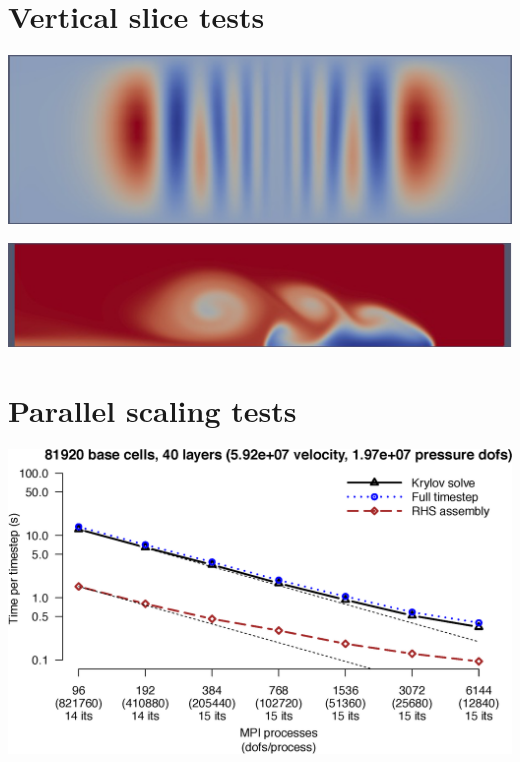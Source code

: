 \documentclass[landscape]{imposter}
\begin{document}
\begin{multicols*}{3}
 \section{Vertical slice tests}
  \centerline{
    \includegraphics[width=25cm]{gw_nh}
    }\centerline{
    \includegraphics[width=25cm]{dc_filled}
}

  \section{Parallel scaling tests}
  \centerline{\includegraphics[width=25cm]{gmres-preonlyS-ref6-layers40}}
\small

\end{multicols*}
\end{document}
